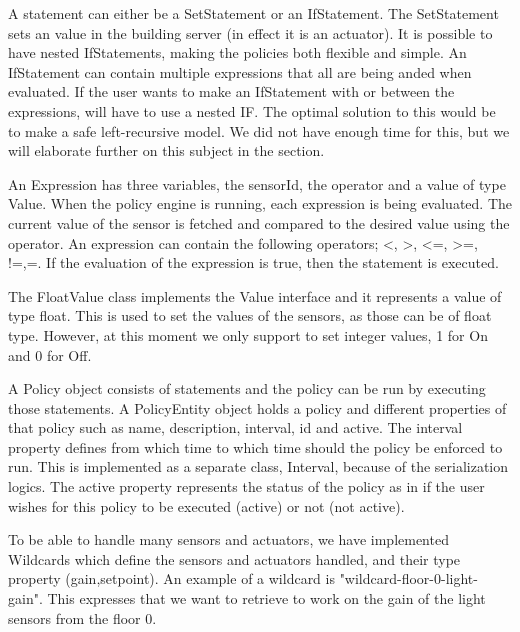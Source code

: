A statement can either be a SetStatement or an IfStatement. The SetStatement sets an value in the building server (in effect it is an actuator). It is possible to have nested IfStatements, making the policies both flexible and simple. An IfStatement can contain multiple expressions that all are being anded when evaluated. If the user wants to make an IfStatement with or between the expressions, will have to use a nested IF. The optimal solution to this would be to make a safe left-recursive model. We did not have enough time for this, but we will elaborate further on this subject in the  section. 

An Expression has three variables, the sensorId, the operator and a value of type Value. When the policy engine is running, each expression is being evaluated. The current value of the sensor is fetched and compared to the desired value using the operator. An expression can contain the following operators; <, >, <=, >=, !=,=. 
If the evaluation of the expression is true, then the statement is executed.

The FloatValue class implements the Value interface and it represents a value of type float. This is used to set the values of the sensors, as those can be of float type. However, at this moment we only support to set integer values, 1 for On and 0 for Off.

A Policy object consists of statements and the policy can be run by executing those statements. A PolicyEntity object holds a policy and different properties of that policy such as name, description, interval, id and active. The interval property defines from which time to which time should the policy be enforced to run. This is implemented as a separate class, Interval, because of the serialization logics.  The active property represents the status of the policy as in if the user wishes for this policy to be executed (active) or not (not active).

To be able to handle many sensors and actuators, we have implemented Wildcards which define the sensors and actuators handled, and their type property (gain,setpoint). An example of a wildcard is "wildcard-floor-0-light-gain". This expresses that we want to retrieve to work on the gain of the light sensors from the floor 0. 
